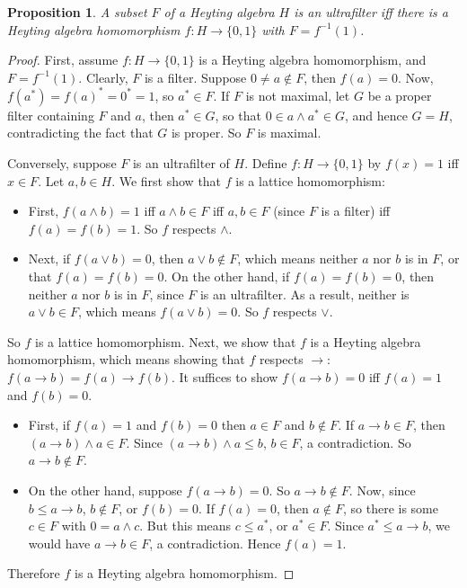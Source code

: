 \documentclass[12pt]{article}
\newtheorem{prop}{Proposition}
\begin{document}
\begin{prop} A subset $F$ of a Heyting algebra $H$ is an ultrafilter iff there is a Heyting algebra homomorphism $f:H\to \lbrace 0,1\rbrace$ with $F=f^{-1}(1)$. \end{prop}
\begin{proof}  First, assume $f:H\to \lbrace 0,1\rbrace$ is a Heyting algebra homomorphism, and $F=f^{-1}(1)$.  Clearly, $F$ is a filter.  Suppose $0\ne a\notin F$, then $f(a)=0$.  Now, $f(a^*)=f(a)^*= 0^*=1$, so $a^*\in F$.  If $F$ is not maximal, let $G$ be a proper filter containing $F$ and $a$, then $a^*\in G$, so that $0\in a\wedge a^* \in G$, and hence $G=H$, contradicting the fact that $G$ is proper.  So $F$ is maximal.  

Conversely, suppose $F$ is an ultrafilter of $H$.  Define $f:H\to \lbrace 0,1\rbrace$ by $f(x)=1$ iff $x\in F$.  Let $a,b\in H$.  We first show that $f$ is a lattice homomorphism:
\begin{itemize}
\item
First, $f(a\wedge b)=1$ iff $a\wedge b\in F$ iff $a,b\in F$ (since $F$ is a filter) iff $f(a)=f(b)=1$.  So $f$ respects $\wedge$.
\item
Next, if $f(a\vee b)=0$, then $a\vee b\notin F$, which means neither $a$ nor $b$ is in $F$, or that $f(a)=f(b)=0$.  On the other hand, if $f(a)=f(b)=0$, then neither $a$ nor $b$ is in $F$, since $F$ is an ultrafilter.  As a result, neither is $a\vee b \in F$, which means $f(a\vee b)=0$.  So $f$ respects $\vee$.
\end{itemize}
So $f$ is a lattice homomorphism.  Next, we show that $f$ is a Heyting algebra homomorphism, which means showing that $f$ respects $\to$: $f(a\to b)=f(a)\to f(b)$.  It suffices to show $f(a\to b)=0$ iff $f(a)=1$ and $f(b)=0$.  
\begin{itemize}
\item
First, if $f(a)=1$ and $f(b)=0$ then $a\in F$ and $b\notin F$.  If $a\to b\in F$, then $(a\to b)\wedge a\in F$.  Since $(a\to b)\wedge a\le b$, $b\in F$, a contradiction.  So $a\to b\notin F$.  
\item
On the other hand, suppose $f(a\to b)=0$.  So $a\to b\notin F$.  Now, since $b\le a\to b$, $b\notin F$, or $f(b)=0$.  If $f(a)=0$, then $a\notin F$, so there is some $c\in F$ with $0=a\wedge c$.  But this means $c\le a^*$, or $a^*\in F$.  Since $a^*\le a\to b$, we would have $a\to b\in F$, a contradiction.  Hence $f(a)=1$.
\end{itemize}
Therefore $f$ is a Heyting algebra homomorphism.
\end{proof}
\end{document}

